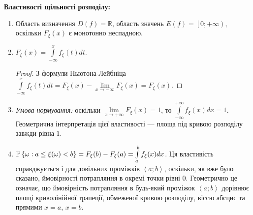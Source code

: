 \vspace{0.5em}
\noindent \textbf{Властивості щільності розподілу:}
\begin{enumerate}
    \item Область визначення $D(f) = \mathbb{R}$, область значень $E(f) = \left[0; +\infty\right)$, оскільки $F_\xi(x)$ є монотонно неспадною.
    \item $F_\xi(x)=\int\limits_{-\infty}^x f_\xi(t)dt$.
    \begin{proof}
        З формули Ньютона-Лейбніца $\int\limits_{-\infty}^x f_\xi(t)dt = F_\xi(x) - \underset{x\to-\infty}{\lim}F_\xi(x) = F_\xi(x)$.
    \end{proof}
    \item \emph{Умова нормування:}  оскільки $\lim\limits_{x \to +\infty} F_\xi(x) = 1$, то $\int\limits_{-\infty}^{+\infty} f_\xi(x)dx = 1$.
    Геометрична інтерпретація цієї властивості --- площа під кривою розподілу завжди рівна $1$.
    \item $\P\left\{\omega: a \leq \xi(\omega) < b\right\} = F_\xi(b) - F_\xi(a) = \int\limits_a^b f_\xi(x)dx$.
    Ця властивість справджується і для довільних проміжків $\left< a; b\right>$,
    оскільки, як вже було сказано, ймовірності потрапляння в окремі точки рівні 0. Геометрично це означає,
    що ймовірність потрапляння в будь-який проміжок $\left< a; b\right>$ дорівнює площі криволінійної трапеції,
    обмеженої кривою розподілу, віссю абсцис та прямими $x=a$, $x=b$.
\end{enumerate}

